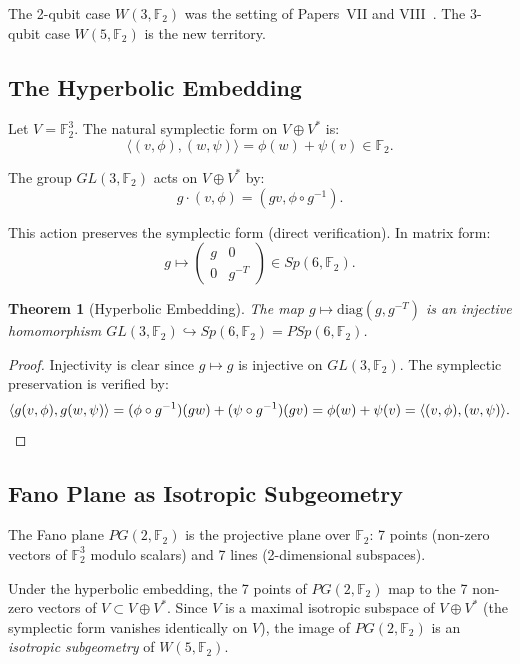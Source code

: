 \documentclass[11pt,a4paper]{article}
\newtheorem{theorem}{Theorem}[section]
\theoremstyle{remark}
\newcommand{\F}{\mathbb{F}}
\begin{document}
The 2-qubit case $W(3, \F_2)$ was the setting of Papers~VII and
VIII~\cite{PaperVII, PaperVIII}. The 3-qubit case $W(5, \F_2)$ is the
new territory.

\subsection{The Hyperbolic Embedding}
\label{sec:hyperbolic-embedding}

Let $V = \F_2^3$. The natural symplectic form on $V \oplus V^*$ is:
\[
\langle (v, \phi), (w, \psi) \rangle = \phi(w) + \psi(v) \in \F_2.
\]

The group $GL(3, \F_2)$ acts on $V \oplus V^*$ by:
\[
g \cdot (v, \phi) = (gv, \phi \circ g^{-1}).
\]

This action preserves the symplectic form (direct verification). In
matrix form:
\[
g \mapsto \begin{pmatrix} g & 0 \\ 0 & g^{-T} \end{pmatrix} \in Sp(6, \F_2).
\]

\begin{theorem}[Hyperbolic Embedding]
\label{thm:hyperbolic}
The map $g \mapsto \mathrm{diag}(g, g^{-T})$ is an injective homomorphism
$GL(3, \F_2) \hookrightarrow Sp(6, \F_2) = PSp(6, \F_2)$.
\end{theorem}

\begin{proof}
Injectivity is clear since $g \mapsto g$ is injective on $GL(3, \F_2)$.
The symplectic preservation is verified by:
\[
\langle g(v, \phi), g(w, \psi) \rangle
= (\phi \circ g^{-1})(gw) + (\psi \circ g^{-1})(gv)
= \phi(w) + \psi(v)
= \langle (v, \phi), (w, \psi) \rangle. \qedhere
\]
\end{proof}

\subsection{Fano Plane as Isotropic Subgeometry}
\label{sec:fano-isotropic}

The Fano plane $PG(2, \F_2)$ is the projective plane over $\F_2$:
7 points (non-zero vectors of $\F_2^3$ modulo scalars) and 7 lines
(2-dimensional subspaces).

Under the hyperbolic embedding, the 7 points of $PG(2, \F_2)$ map to
the 7 non-zero vectors of $V \subset V \oplus V^*$. Since $V$ is a
maximal isotropic subspace of $V \oplus V^*$ (the symplectic form
vanishes identically on $V$), the image of $PG(2, \F_2)$ is an
\emph{isotropic subgeometry} of $W(5, \F_2)$.
\end{document}
